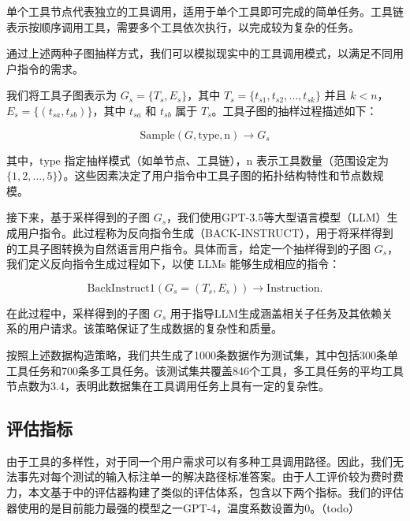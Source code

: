单个工具节点代表独立的工具调用，适用于单个工具即可完成的简单任务。工具链表示按顺序调用工具，需要多个工具依次执行，以完成较为复杂的任务。

通过上述两种子图抽样方式，我们可以模拟现实中的工具调用模式，以满足不同用户指令的需求。

我们将工具子图表示为 \( G_s = \{T_s, E_s\} \)，其中 \( T_s = \{t_{s1}, t_{s2}, \dots, t_{sk}\} \) 并且 \( k < n \)，\( E_s = \{(t_{sa}, t_{sb})\} \)，其中 \( t_{sa} \) 和 \( t_{sb} \) 属于 \( T_s \)。工具子图的抽样过程描述如下：

\[
\text{Sample}(G, \text{type}, \text{n}) \rightarrow G_s
\]

其中，\(\text{type}\) 指定抽样模式（如单节点、工具链），\(\text{n}\) 表示工具数量（范围设定为 \(\{1, 2, \dots, 5\}\)）。这些因素决定了用户指令中工具子图的拓扑结构特性和节点数规模。

接下来，基于采样得到的子图 \( G_s \)，我们使用GPT-3.5等大型语言模型（LLM）生成用户指令。此过程称为反向指令生成（BACK-INSTRUCT），用于将采样得到的工具子图转换为自然语言用户指令。具体而言，给定一个抽样得到的子图 \( G_s \)，我们定义反向指令生成过程如下，以使 LLMs 能够生成相应的指令：

\[
\text{BackInstruct1}(G_s = (T_s, E_s)) \rightarrow \text{Instruction}.
\]

在此过程中，采样得到的子图 \( G_s \) 用于指导LLM生成涵盖相关子任务及其依赖关系的用户请求。该策略保证了生成数据的复杂性和质量。

按照上述数据构造策略，我们共生成了1000条数据作为测试集，其中包括300条单工具任务和700条多工具任务。该测试集共覆盖846个工具，多工具任务的平均工具节点数为3.4，表明此数据集在工具调用任务上具有一定的复杂性。

\subsection{评估指标}
由于工具的多样性，对于同一个用户需求可以有多种工具调用路径。因此，我们无法事先对每个测试的输入标注单一的解决路径标准答案。由于人工评价较为费时费力，本文基于\cite{Tang2023}中的评估器构建了类似的评估体系，包含以下两个指标。我们的评估器使用的是目前能力最强的模型之一GPT-4，温度系数设置为0。（todo）

